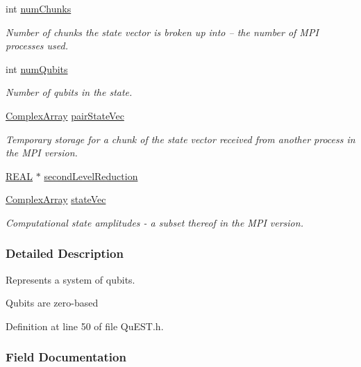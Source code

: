 \begin{DoxyCompactItemize}
int \mbox{\hyperlink{structMultiQubit_acd43f2f57991709c9e94f73662c972b2}{num\+Chunks}}
\begin{DoxyCompactList}\small\item\em Number of chunks the state vector is broken up into -- the number of M\+PI processes used. \end{DoxyCompactList}\item 
int \mbox{\hyperlink{structMultiQubit_ab5b9795bdc6fb5855e1974dcbbaeb36f}{num\+Qubits}}
\begin{DoxyCompactList}\small\item\em Number of qubits in the state. \end{DoxyCompactList}\item 
\mbox{\hyperlink{structComplexArray}{Complex\+Array}} \mbox{\hyperlink{structMultiQubit_a76f7db4eab52d2b30f58f973ada809c5}{pair\+State\+Vec}}
\begin{DoxyCompactList}\small\item\em Temporary storage for a chunk of the state vector received from another process in the M\+PI version. \end{DoxyCompactList}\item 
\mbox{\hyperlink{QuEST__precision_8h_a4b654506f18b8bfd61ad2a29a7e38c25}{R\+E\+AL}} $\ast$ \mbox{\hyperlink{structMultiQubit_a3e859cefa146ec7b30464ab3d897930b}{second\+Level\+Reduction}}
\item 
\mbox{\hyperlink{structComplexArray}{Complex\+Array}} \mbox{\hyperlink{structMultiQubit_a45483190d6b01ef6b2f98f2bec9ab94f}{state\+Vec}}
\begin{DoxyCompactList}\small\item\em Computational state amplitudes -\/ a subset thereof in the M\+PI version. \end{DoxyCompactList}\end{DoxyCompactItemize}


\subsubsection{Detailed Description}
Represents a system of qubits. 

Qubits are zero-\/based 

Definition at line 50 of file Qu\+E\+S\+T.\+h.



\subsubsection{Field Documentation}
\mbox{\label{structMultiQubit_ab10c88249fa3825d6227ceec01d37e37}} 
